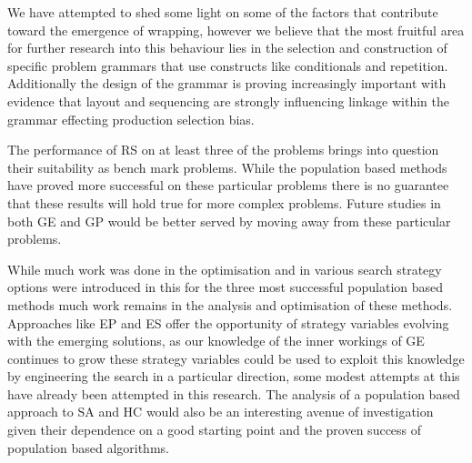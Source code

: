 We have attempted to shed some light on some of the factors that contribute toward the emergence of wrapping, however we believe that the most fruitful area for further research into  this behaviour lies in the selection and construction of specific problem grammars that use constructs like conditionals and repetition. Additionally the design of the grammar is proving increasingly important with evidence that layout and sequencing are strongly influencing linkage within the grammar effecting production selection bias.   

The performance of RS on at least three of the problems brings into question their suitability as bench mark problems. While the population based methods have proved more successful on these particular problems there is no guarantee that these results will hold true for more complex problems. Future studies in both GE and GP would be better served by moving away from these particular problems.  

While much work was done in the optimisation and in various search strategy options were introduced in this for the three most successful population based methods much work remains in the analysis and optimisation of these methods. Approaches like EP and ES offer the opportunity of strategy variables evolving with the emerging solutions, as our knowledge of the inner workings of GE continues to grow these strategy variables could be used to exploit this knowledge by engineering the search in a particular direction, some modest attempts at this have already been attempted in this research. The analysis of a population based approach to SA and HC would also be an interesting avenue of investigation given their dependence on a good starting point and the proven success of population based algorithms.











